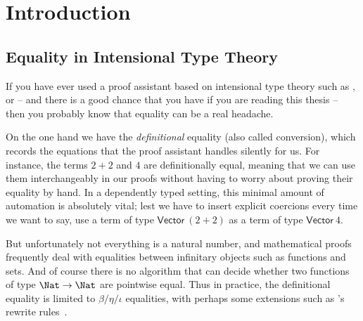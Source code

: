\setchapterpreamble[u]{\margintoc}
\chapter{Introduction}

\section{Equality in Intensional Type Theory}

If you have ever used a proof assistant based on intensional type theory such as
\Coq, \Agda or {\Lean} -- and there is a good chance that you have if you are 
reading this thesis -- then you probably know that equality can be a real headache.

On the one hand we have the \emph{definitional} equality (also called conversion), which records the 
equations that the proof assistant handles silently for us.
% 
% 
For instance, the terms \( 2+2 \) and \( 4 \) are definitionally equal, meaning that we 
can use them interchangeably in our proofs without having to worry about 
proving their equality by hand.
% 
In a dependently typed setting, this minimal amount of automation is absolutely vital; 
lest we have to insert explicit coercions every time we want to say, use a term 
of type \( \mathsf{Vector}\ (2+2) \) as a term of type \( \mathsf{Vector}\ 4 \).

But unfortunately not everything is a natural 
number, and mathematical proofs
frequently deal with equalities between infinitary objects such as functions and 
sets.
% 
And of course there is no algorithm that can decide whether
two functions of type \( \Nat \to \Nat \) are pointwise equal.
% 
Thus in practice, the definitional equality is limited to 
\( \beta / \eta / \iota \) equalities, with perhaps some extensions
such as \Agda's rewrite rules~.

